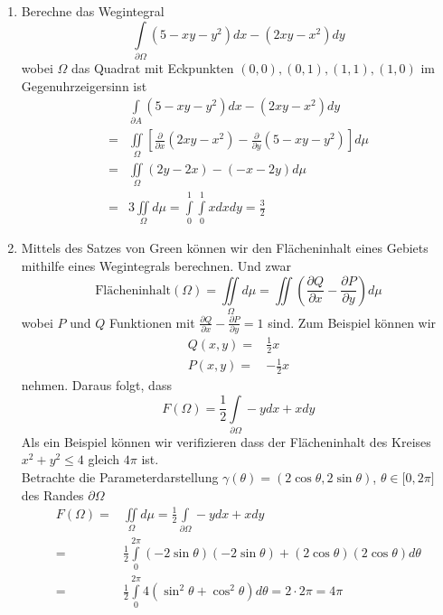 \begin{enumerate}
\item Berechne das Wegintegral \[\int\limits_{\partial \Omega } {\left( {5 - xy - {y^2}} \right)dx - \left( {2xy - {x^2}} \right)dy} \] wobei $\Omega$ das Quadrat mit Eckpunkten $(0,0),(0,1),(1,1),(1,0)$ im Gegenuhrzeigersinn ist
\begin{align*}
&\int\limits_{\partial A} {\left( {5 - xy - {y^2}} \right)dx - \left( {2xy - {x^2}} \right)dy} \\
=&\iint\limits_\Omega\left[ {\frac{\partial }{{\partial x}}\left( {2xy - {x^2}} \right) - \frac{\partial }{{\partial y}}\left( {5 - xy - {y^2}} \right)} \right]d\mu \\
=&\iint\limits_\Omega\left(  2y-2x\right) - \left( -x-2y\right) d\mu\\
=&3\iint\limits_\Omega d\mu=\int\limits_0^1\int\limits_0^1 x dx dy=\frac{3}{2}
\end{align*}
\item Mittels des Satzes von Green können wir den Flächeninhalt eines Gebiets mithilfe eines Wegintegrals berechnen. Und zwar
\[ \text{Flächeninhalt$\left( \Omega\right)$}=\iint\limits_\Omega d\mu=\iint\left( \frac{\partial Q}{\partial x}-\frac{\partial P}{\partial y}\right) d\mu\]
wobei $P$ und $Q$ Funktionen mit $\frac{\partial Q}{\partial x}-\frac{\partial P}{\partial y}=1$ sind. Zum Beispiel können wir
\begin{align*}
Q\left( x,y\right)=&\frac{1}{2}x\\
P\left( x,y\right)=&-\frac{1}{2}x
\end{align*}
nehmen. Daraus folgt, dass \[ F\left( \Omega\right) = \frac{1}{2}\int\limits_{\partial\Omega}-y dx+xdy\]
Als ein Beispiel können wir verifizieren dass der Flächeninhalt des Kreises $x^2+y^2\leq 4$ gleich $4\pi$ ist. \\

Betrachte die Parameterdarstellung $\gamma\left(\theta\right)=\left( 2\cos\theta,2\sin\theta\right)$, $\theta\in\lbrack 0,2\pi\rbrack$ des Randes $\partial\Omega$
\begin{align*}
F\left(\Omega\right)=&\iint\limits_\Omega d\mu = \frac{1}{2}\int\limits_{\partial\Omega} -ydx+xdy\\
=&\frac{1}{2}\int\limits_0^{2\pi}\left( -2\sin\theta\right)\left( -2\sin\theta\right) + \left( 2\cos\theta\right)\left( 2\cos\theta\right) d\theta\\
=&\frac{1}{2}\int\limits_0^{2\pi}4\left( \sin^2\theta+\cos^2\theta\right)d\theta=2\cdot 2\pi=4\pi
\end{align*}
\end{enumerate}
